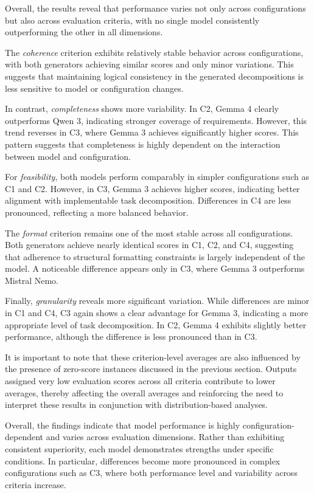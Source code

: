 \documentclass[pdflatex,sn-mathphys-num]{sn-jnl}
\theoremstyle{thmstyleone}%
\theoremstyle{thmstyletwo}%
\theoremstyle{thmstylethree}%
\begin{document}
Overall, the results reveal that performance varies not only across configurations but also across evaluation criteria, with no single model consistently outperforming the other in all dimensions.

The \textit{coherence} criterion exhibits relatively stable behavior across configurations, with both generators achieving similar scores and only minor variations. This suggests that maintaining logical consistency in the generated decompositions is less sensitive to model or configuration changes.

In contrast, \textit{completeness} shows more variability. In C2, Gemma 4 clearly outperforms Qwen 3, indicating stronger coverage of requirements. However, this trend reverses in C3, where Gemma 3 achieves significantly higher scores. This pattern suggests that completeness is highly dependent on the interaction between model and configuration.

For \textit{feasibility}, both models perform comparably in simpler configurations such as C1 and C2. However, in C3, Gemma 3 achieves higher scores, indicating better alignment with implementable task decomposition. Differences in C4 are less pronounced, reflecting a more balanced behavior.

The \textit{format} criterion remains one of the most stable across all configurations. Both generators achieve nearly identical scores in C1, C2, and C4, suggesting that adherence to structural formatting constraints is largely independent of the model. A noticeable difference appears only in C3, where Gemma 3 outperforms Mistral Nemo.

Finally, \textit{granularity} reveals more significant variation. While differences are minor in C1 and C4, C3 again shows a clear advantage for Gemma 3, indicating a more appropriate level of task decomposition. In C2, Gemma 4 exhibits slightly better performance, although the difference is less pronounced than in C3.

It is important to note that these criterion-level averages are also influenced by the presence of zero-score instances discussed in the previous section. Outputs assigned very low evaluation scores across all criteria contribute to lower averages, thereby affecting the overall averages and reinforcing the need to interpret these results in conjunction with distribution-based analyses.

Overall, the findings indicate that model performance is highly configuration-dependent and varies across evaluation dimensions. Rather than exhibiting consistent superiority, each model demonstrates strengths under specific conditions. In particular, differences become more pronounced in complex configurations such as C3, where both performance level and variability across criteria increase.
\end{document}
